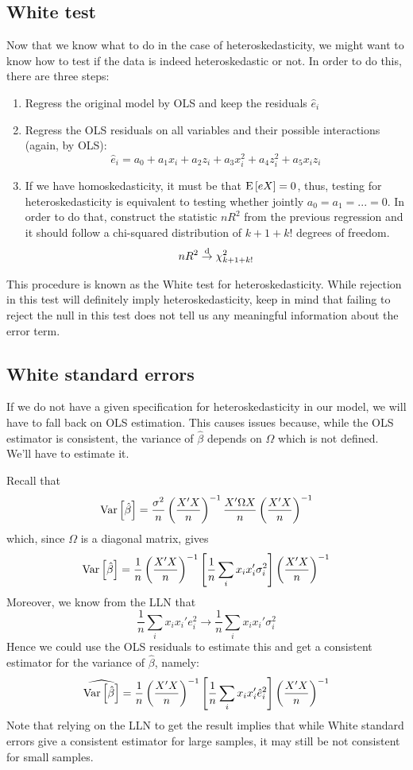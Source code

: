 \subsection{White test}

Now that we know what to do in the case of heteroskedasticity, we might want to know how to test if the data is indeed heteroskedastic or not. In order to do this, there are three steps:\begin{enumerate}
\item Regress the original model by OLS and keep the residuals $\hat e_i$
\item Regress the OLS residuals on all variables and their possible interactions (again, by OLS): $$ \hat e_i = a_0 + a_1x_i + a_2z_i + a_3x_i^2 + a_4z_i^2 + a_5x_iz_i $$
\item If we have homoskedasticity, it must be that $\operatorname{E}\left[eX\right] = 0$, thus, testing for heteroskedasticity is equivalent to testing whether jointly $a_0 = a_1 = ... = 0$. In order to do that, construct the statistic $nR^2$ from the previous regression and it should follow a chi-squared distribution of $k + 1 + k!$ degrees of freedom. $$nR^2\overset{\text{d}}{\to} \chi_{k+1+k!}^2$$
\end{enumerate} This procedure is known as the White test for heteroskedasticity. While rejection in this test will definitely imply heteroskedasticity, keep in mind that failing to reject the null in this test does not tell us any meaningful information about the error term.

\subsection{White standard errors}

If we do not have a given specification for heteroskedasticity in our model, we will have to fall back on OLS estimation. This causes issues because, while the OLS estimator is consistent, the variance of $\hat\beta$ depends on $\Omega$ which is not defined. We'll have to estimate it.

Recall that $$\operatorname{Var}\left[\hat\beta\right] = \frac{\sigma^2}{n}\left(\frac{X'X}{n}\right)^{-1}\frac{X'\Omega X}{n}\left(\frac{X'X}{n}\right)^{-1} $$ which, since $\Omega$ is a diagonal matrix, gives $$
\operatorname{Var}\left[\hat\beta\right] = \frac{1}{n}\left(\frac{X'X}{n}\right)^{-1}\left[\frac{1}{n}\sum_{i}x_ix_i'\sigma_i^2\right]\left(\frac{X'X}{n}\right)^{-1}
$$ Moreover, we know from the LLN that $$\frac{1}{n}\sum_{i}x_ix_i'e_i^2 \to \frac{1}{n}\sum_{i}x_ix_i'\sigma_i^2 $$ Hence we could use the OLS residuals to estimate this and get a consistent estimator for the variance of $\hat\beta$, namely: $$\widehat{\operatorname{Var}\left[\hat\beta\right]} = \frac{1}{n}\left(\frac{X'X}{n}\right)^{-1}\left[\frac{1}{n}\sum_{i}x_ix_i'\hat e_i^2\right]\left(\frac{X'X}{n}\right)^{-1} $$ Note that relying on the LLN to get the result implies that while White standard errors give a consistent estimator for large samples, it may still be not consistent for small samples.


